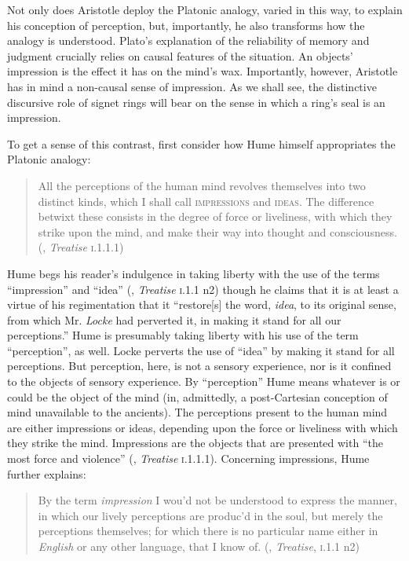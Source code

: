 Not only does Aristotle deploy the Platonic analogy, varied in this way, to explain his conception of perception, but, importantly, he also transforms how the analogy is understood. Plato's explanation of the reliability of memory and judgment crucially relies on causal features of the situation. An objects' impression is the effect it has on the mind's wax. Importantly, however, Aristotle has in mind a non-causal sense of impression. As we shall see, the distinctive discursive role of signet rings will bear on the sense in which a ring's seal is an impression.

To get a sense of this contrast, first consider how Hume himself appropriates the Platonic analogy:
\begin{quote}
	All the perceptions of the human mind revolves themselves into two distinct kinds, which I shall call \textsc{impressions} and \textsc{ideas}. The difference betwixt these consists in the degree of force or liveliness, with which they strike upon the mind, and make their way into thought and consciousness. (\citealt{Hume:1739kx}, \emph{Treatise} \textsc{i}.1.1.1)
\end{quote}
Hume begs his reader's indulgence in taking liberty with the use of the terms ``impression'' and ``idea'' (\citealt{Hume:1739kx}, \emph{Treatise} \textsc{i}.1.1 n2) though he claims that it is at least a virtue of his regimentation that it ``restore[s] the word, \emph{idea}, to its original sense, from which Mr. \emph{Locke} had perverted it, in making it stand for all our perceptions.'' Hume is presumably taking liberty with his use of the term ``perception'', as well. Locke perverts the use of ``idea'' by making it stand for all perceptions. But perception, here, is not a sensory experience, nor is it confined to the objects of sensory experience. By ``perception'' Hume means whatever is or could be the object of the mind (in, admittedly, a post-Cartesian conception of mind unavailable to the ancients). The perceptions present to the human mind are either impressions or ideas, depending upon the force or liveliness with which they strike the mind. Impressions are the objects that are presented with ``the most force and violence'' (\citealt{Hume:1739kx}, \emph{Treatise} \textsc{i}.1.1.1).  Concerning impressions, Hume further explains:
\begin{quote}
	By the term \emph{impression} I wou'd not be understood to express the manner, in which our lively perceptions are produc'd in the soul, but merely the perceptions themselves; for which there is no particular name either in \emph{English} or any other language, that I know of. (\citealt{Hume:1739kx}, \emph{Treatise}, \textsc{i}.1.1 n2)
\end{quote}
